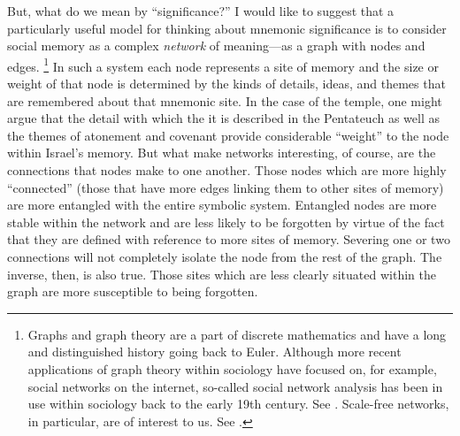 But, what do we mean by ``significance?'' I would like to suggest that a particularly useful model for thinking about mnemonic significance is to consider social memory as a complex \emph{network} of meaning---as a graph with nodes and edges.%
    \footnote{Graphs and graph theory are a part of discrete mathematics and have a long and distinguished history going back to Euler. Although more recent applications of graph theory within sociology have focused on, for example, social networks on the internet, so-called social network analysis has been in use within sociology back to the early 19th century. See \cite[10--16]{linton2004}. Scale-free networks, in particular, are of interest to us. See \cite{barabasi_science2009}.}
In such a system each node represents a site of memory and the size or weight of that node is determined by the kinds of details, ideas, and themes that are remembered about that mnemonic site. In the case of the temple, one might argue that the detail with which the it is described in the Pentateuch as well as the themes of atonement and covenant provide considerable ``weight'' to the node within Israel's memory. But what make networks interesting, of course, are the connections that nodes make to one another. Those nodes which are more highly ``connected'' (those that have more edges linking them to other sites of memory) are more entangled with the entire symbolic system. Entangled nodes are more stable within the network and are less likely to be forgotten by virtue of the fact that they are defined with reference to more sites of memory. Severing one or two connections will not completely isolate the node from the rest of the graph. The inverse, then, is also true. Those sites which are less clearly situated within the graph are more susceptible to being forgotten.

